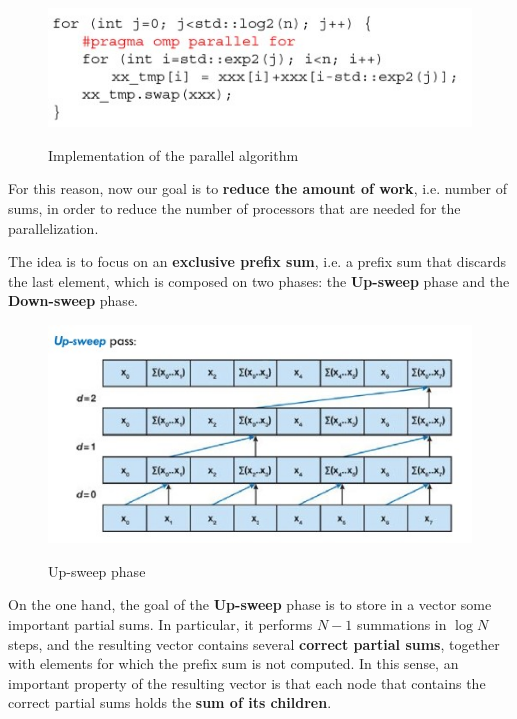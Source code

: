 \begin{figure}[h!]
		\centering
		\includegraphics[scale = 1.6]{img/prefix sum algo.jpg}
        \label{prefix sum algo}
        \caption{Implementation of the parallel algorithm}
\end{figure}

For this reason, now our goal is to \textbf{reduce the amount of work}, i.e. number of sums, in order to reduce the number of processors that are needed for the parallelization.

The idea is to focus on an \textbf{exclusive prefix sum}, i.e. a prefix sum that discards the last element, which is composed on two phases: the \textbf{Up-sweep} phase and the \textbf{Down-sweep} phase. 

\begin{figure}[h!]
		\centering
		\includegraphics[scale = 2.0]{img/up-sweep.jpg}
        \label{up-sweep}
        \caption{Up-sweep phase}
\end{figure}

On the one hand, the goal of the \textbf{Up-sweep} phase is to store in a vector some important partial sums. In particular, it performs $N-1$ summations in $\log N$ steps, and the resulting vector contains several \textbf{correct partial sums}, together with elements for which the prefix sum is not computed. In this sense, an important property of the resulting vector is that each node that contains the correct partial sums holds the \textbf{sum of its children}.


